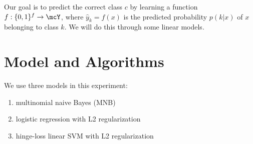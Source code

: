 \documentclass[11pt]{article}
\begin{document}
Our goal is to predict the correct class $c$ by learning a function $f : \{0, 1\}^f \to \mcY$, where $\widehat{y}_k = f(x)$ is the predicted probability $p(k | x)$ of $x$ belonging to class $k$. We will do this through some linear models.

%
%
%




\section{Model and Algorithms}

We use three models in this experiment:

\begin{enumerate}
\item multinomial naive Bayes (MNB)
\item logistic regression with L2 regularization
\item hinge-loss linear SVM with L2 regularization 
\end{enumerate}
\end{document}

